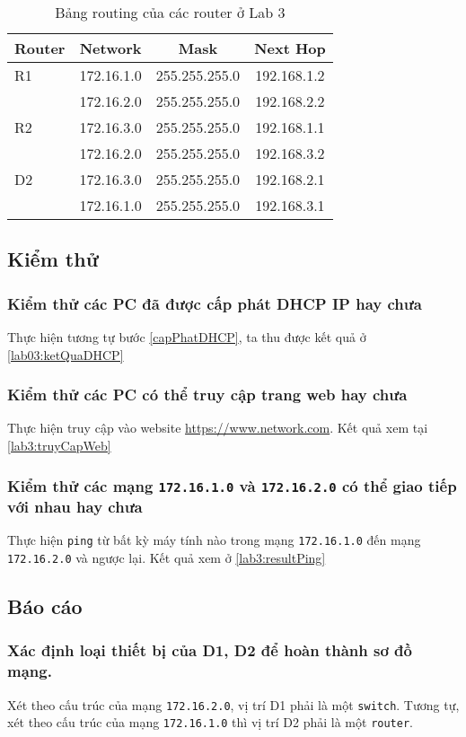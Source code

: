 \documentclass[]{article}
\begin{document}
\begin{table}[H]
    \centering
    \caption{Bảng routing của các router ở Lab 3}\label{lab3:static}
    \begin{tabular}[t]{lccc}
        \toprule
        Router&Network&Mask&Next Hop\\
        \midrule
        R1&172.16.1.0&255.255.255.0&192.168.1.2\\
          &172.16.2.0&255.255.255.0&192.168.2.2\\
        \midrule
        R2&172.16.3.0&255.255.255.0&192.168.1.1\\
          &172.16.2.0&255.255.255.0&192.168.3.2\\
        \midrule
        D2&172.16.3.0&255.255.255.0&192.168.2.1\\
          &172.16.1.0&255.255.255.0&192.168.3.1\\
        \bottomrule
    \end{tabular}
\end{table}
\subsection{Kiểm thử}
\subsubsection{Kiểm thử các PC đã được cấp phát DHCP IP hay chưa}
Thực hiện tương tự bước \ref{capPhatDHCP}, ta thu được kết quả ở \ref{lab03:ketQuaDHCP}
\subsubsection{Kiểm thử các PC có thể truy cập trang web hay chưa}
Thực hiện truy cập vào website \href{https://www.network.com}{https://www.network.com}. Kết quả xem tại \ref{lab3:truyCapWeb}
\subsubsection{Kiểm thử các mạng \texttt{172.16.1.0} và \texttt{172.16.2.0} có thể giao tiếp với nhau hay chưa}
Thực hiện \texttt{ping} từ bất kỳ máy tính nào trong mạng \texttt{172.16.1.0} đến mạng \texttt{172.16.2.0} và ngược lại. Kết quả xem ở \ref{lab3:resultPing}
\subsection{Báo cáo}
\subsubsection{Xác định loại thiết bị của D1, D2 để hoàn thành sơ đồ mạng.}\label{lab03:loaitb}
Xét theo cấu trúc của mạng \texttt{172.16.2.0}, vị trí D1 phải là một \texttt{switch}. Tương tự, xét theo cấu trúc của mạng \texttt{172.16.1.0} thì vị trí D2 phải là một \texttt{router}.
\end{document}
